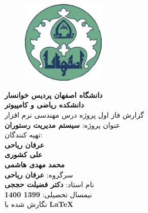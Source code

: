 \begin{center}
		\thispagestyle{empty}
		\vspace*{1cm}
		\begin{figure}
			\begin{center}
				\includegraphics[width=4cm, height=4cm]{UniversityLogo}
			\end{center}
		\end{figure}
		\vspace{-1cm}
		\Large{
			\textbf{دانشگاه اصفهان \lr{-} پردیس خوانسار \\
				دانشکده ریاضی و کامپیوتر \\
			}
		}
		\vspace{2cm}
		\LARGE{
			گزارش فاز اول پروژه درس مهندسی نرم افزار \\
				عنوان پروژه: \textbf{سیستم مدیریت رستوران}\\
		}
		\vspace{2cm}		
		\Large{
			تهیه کنندگان:\\
			\textbf{
			عرفان ریاحی\\
			علی کشوری\\
			محمد مهدی هاشمی\\
			}
		}
		\vspace{2cm}		
		\Large{
			سرگروه: \textbf{عرفان ریاحی}\\
			نام استاد: \textbf{دکتر فضیلت حججی}\\
			نیمسال تحصیلی: \textbf{1399 \lr{-} 1400}\\
			نگارش شده با\textbf{ \LaTeX}
		}
	\end{center}